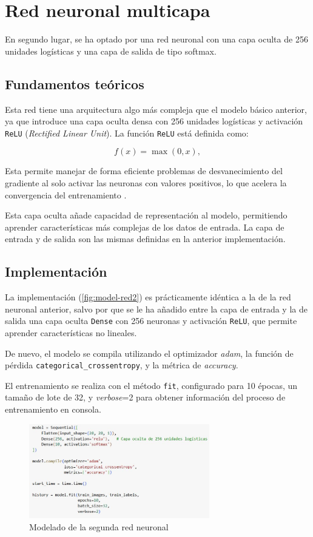 \section{Red neuronal multicapa}

En segundo lugar, se ha optado por una red neuronal con una capa oculta de 256 unidades logísticas y una capa de salida de tipo softmax.

\subsection{Fundamentos teóricos}

Esta red tiene una arquitectura algo más compleja que el modelo básico anterior, ya que introduce una capa oculta densa con 256 unidades logísticas y activación \texttt{ReLU} (\textit{Rectified Linear Unit}). La función \texttt{ReLU} está definida como:

\[
f(x) = \max(0, x),
\]

Esta permite manejar de forma eficiente problemas de desvanecimiento del gradiente al solo activar las neuronas con valores positivos, lo que acelera la convergencia del entrenamiento \parencite{nair2010relu}.

Esta capa oculta añade capacidad de representación al modelo, permitiendo aprender características más complejas de los datos de entrada. La capa de entrada y de salida son las mismas definidas en la anterior implementación.


\subsection{Implementación}

La implementación (\autoref{fig:model-red2}) es prácticamente idéntica a la de la red neuronal anterior, salvo por que se le ha añadido entre la capa de entrada y la de salida una capa oculta \texttt{Dense} con 256 neuronas y activación \texttt{ReLU}, que permite aprender características no lineales.

De nuevo, el modelo se compila utilizando el optimizador \textit{adam}, la función de pérdida \texttt{categorical\_crossentropy}, y la métrica de \textit{accuracy}.

El entrenamiento se realiza con el método \texttt{fit}, configurado para 10 épocas, un tamaño de lote de 32, y \textit{verbose}=2 para obtener información del proceso de entrenamiento en consola.

\begin{figure}[H]
	\centering
	\includegraphics[width=0.7\textwidth]{imgs/model-red2.JPG}
	\caption{Modelado de la segunda red neuronal}
	\label{fig:model-red2}
\end{figure}

